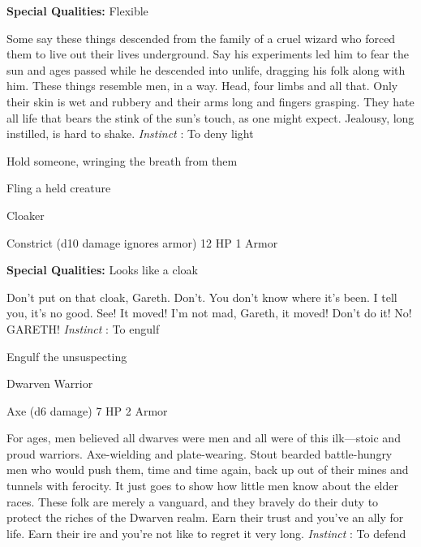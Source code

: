        
\startMonsterQualities
         {\bf Special Qualities:}  Flexible
\stopMonsterQualities
       
\startMonsterDescription
Some say these things descended from the family of a cruel wizard who forced them to live out their lives underground. Say his experiments led him to fear the sun and ages passed while he descended into unlife, dragging his folk along with him. These things resemble men, in a way. Head, four limbs and all that. Only their skin is wet and rubbery and their arms long and fingers grasping. They hate all life that bears the stink of the sun’s touch, as one might expect. Jealousy, long instilled, is hard to shake. {\em Instinct} : To deny light
\stopMonsterDescription
       
\startitemize[1,packed]
         
\item Hold someone, wringing the breath from them

         
\item Fling a held creature

       
\stopitemize
       
\startMonsterName
Cloaker	 
\stopMonsterName
       

Constrict (d10 damage ignores armor)	12 HP	1 Armor

       


       
\startMonsterQualities
         {\bf Special Qualities:}  Looks like a cloak
\stopMonsterQualities
       
\startMonsterDescription
Don’t put on that cloak, Gareth. Don’t. You don’t know where it’s been. I tell you, it’s no good. See! It moved! I’m not mad, Gareth, it moved! Don’t do it! No! GARETH! {\em Instinct} : To engulf
\stopMonsterDescription
       
\startitemize[1,packed]
         
\item Engulf the unsuspecting

       
\stopitemize
       
\startMonsterName
Dwarven Warrior	 
\stopMonsterName
       

Axe (d6 damage)	7 HP	2 Armor

       


       
\startMonsterDescription
For ages, men believed all dwarves were men and all were of this ilk—stoic and proud warriors. Axe-wielding and plate-wearing. Stout bearded battle-hungry men who would push them, time and time again, back up out of their mines and tunnels with ferocity. It just goes to show how little men know about the elder races. These folk are merely a vanguard, and they bravely do their duty to protect the riches of the Dwarven realm. Earn their trust and you’ve an ally for life. Earn their ire and you’re not like to regret it very long. {\em Instinct} : To defend
\stopMonsterDescription
       
